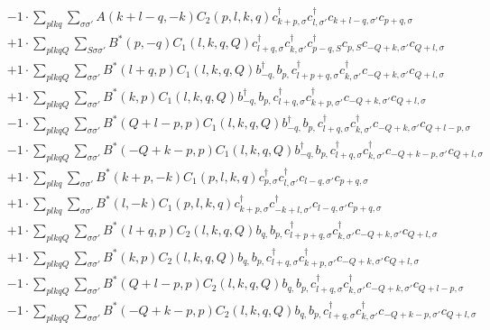 \begin{align*}
	&-1 \cdot \sum_{ p l k q } \sum_{ \sigma \sigma' } A( k+l-q, -k )  C_2( p, l, k, q )   c_{ k+p, \sigma }^\dagger  c_{ l, \sigma' }^\dagger  c_{ k+l-q, \sigma' } c_{ p+q, \sigma }  \\
	&+1 \cdot \sum_{ p l k q Q } \sum_{ S \sigma \sigma' } B^*( p, -q )  C_1( l, k, q, Q )   c_{ l+q, \sigma }^\dagger  c_{ k, \sigma' }^\dagger  c_{ p-q, S }^\dagger  c_{ p, S } c_{ -Q+k, \sigma' } c_{ Q+l, \sigma }  \\
	&+1 \cdot \sum_{ p l k q Q } \sum_{ \sigma \sigma' } B^*( l+q, p )  C_1( l, k, q, Q )   b_{ -q, }^\dagger  b_{ p, } c_{ l+p+q, \sigma }^\dagger  c_{ k, \sigma' }^\dagger  c_{ -Q+k, \sigma' } c_{ Q+l, \sigma }  \\
	&+1 \cdot \sum_{ p l k q Q } \sum_{ \sigma \sigma' } B^*( k, p )  C_1( l, k, q, Q )   b_{ -q, }^\dagger  b_{ p, } c_{ l+q, \sigma }^\dagger  c_{ k+p, \sigma' }^\dagger  c_{ -Q+k, \sigma' } c_{ Q+l, \sigma }  \\
	&-1 \cdot \sum_{ p l k q Q } \sum_{ \sigma \sigma' } B^*( Q+l-p, p )  C_1( l, k, q, Q )   b_{ -q, }^\dagger  b_{ p, } c_{ l+q, \sigma }^\dagger  c_{ k, \sigma' }^\dagger  c_{ -Q+k, \sigma' } c_{ Q+l-p, \sigma }  \\
	&-1 \cdot \sum_{ p l k q Q } \sum_{ \sigma \sigma' } B^*( -Q+k-p, p )  C_1( l, k, q, Q )   b_{ -q, }^\dagger  b_{ p, } c_{ l+q, \sigma }^\dagger  c_{ k, \sigma' }^\dagger  c_{ -Q+k-p, \sigma' } c_{ Q+l, \sigma }  \\
	&+1 \cdot \sum_{ p l k q } \sum_{ \sigma \sigma' } B^*( k+p, -k )  C_1( p, l, k, q )   c_{ p, \sigma }^\dagger  c_{ l, \sigma' }^\dagger  c_{ l-q, \sigma' } c_{ p+q, \sigma }  \\
	&+1 \cdot \sum_{ p l k q } \sum_{ \sigma \sigma' } B^*( l, -k )  C_1( p, l, k, q )   c_{ k+p, \sigma }^\dagger  c_{ -k+l, \sigma' }^\dagger  c_{ l-q, \sigma' } c_{ p+q, \sigma }  \\
	&+1 \cdot \sum_{ p l k q Q } \sum_{ \sigma \sigma' } B^*( l+q, p )  C_2( l, k, q, Q )   b_{ q, } b_{ p, } c_{ l+p+q, \sigma }^\dagger  c_{ k, \sigma' }^\dagger  c_{ -Q+k, \sigma' } c_{ Q+l, \sigma }  \\
	&+1 \cdot \sum_{ p l k q Q } \sum_{ \sigma \sigma' } B^*( k, p )  C_2( l, k, q, Q )   b_{ q, } b_{ p, } c_{ l+q, \sigma }^\dagger  c_{ k+p, \sigma' }^\dagger  c_{ -Q+k, \sigma' } c_{ Q+l, \sigma }  \\
	&-1 \cdot \sum_{ p l k q Q } \sum_{ \sigma \sigma' } B^*( Q+l-p, p )  C_2( l, k, q, Q )   b_{ q, } b_{ p, } c_{ l+q, \sigma }^\dagger  c_{ k, \sigma' }^\dagger  c_{ -Q+k, \sigma' } c_{ Q+l-p, \sigma }  \\
	&-1 \cdot \sum_{ p l k q Q } \sum_{ \sigma \sigma' } B^*( -Q+k-p, p )  C_2( l, k, q, Q )   b_{ q, } b_{ p, } c_{ l+q, \sigma }^\dagger  c_{ k, \sigma' }^\dagger  c_{ -Q+k-p, \sigma' } c_{ Q+l, \sigma } 
\end{align*}
